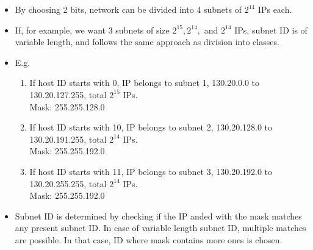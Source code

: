 \documentclass{article}
\begin{document}
\begin{itemize}
		\item By choosing 2 bits, network can be divided into 4 subnets of $2^{14}$ IPs each.
		\item If, for example, we want 3 subnets of size $2^{15}, 2^{14},$ and $2^{14}$ IPs, subnet ID is of variable length, and follows the same approach as division into classes.
		\item E.g. \begin{enumerate}
			\item If host ID starts with 0, IP belongs to subnet 1, 130.20.0.0 to 130.20.127.255, total $2^{15}$ IPs.
			\\ Mask: 255.255.128.0
			\item If host ID starts with 10, IP belongs to subnet 2, 130.20.128.0 to 130.20.191.255, total $2^{14}$ IPs.
			\\ Mask: 255.255.192.0
			\item If host ID starts with 11, IP belongs to subnet 3, 130.20.192.0 to 130.20.255.255, total $2^{14}$ IPs.
			\\ Mask: 255.255.192.0
		\end{enumerate}
		\item Subnet ID is determined by checking if the IP anded with the mask matches any present subnet ID. In case of variable length subnet ID, multiple matches are possible. In that case, ID where mask contains more ones is chosen.
	\end{itemize}
\end{document}
